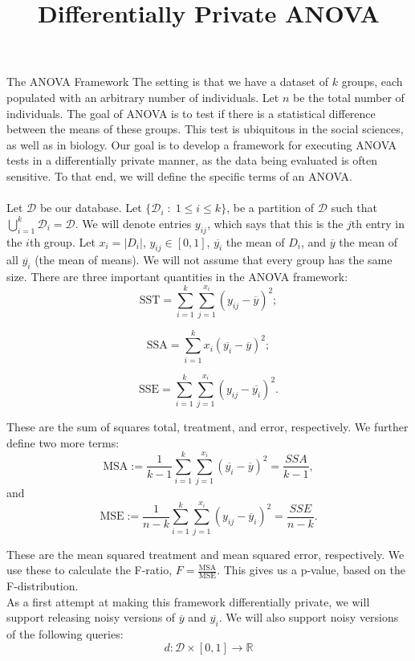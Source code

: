 \documentclass[11pt]{article}
\begin{document}
\title{Differentially Private ANOVA}

\maketitle


\begin{section}{The ANOVA Framework}
The setting is that we have a dataset of $k$ groups, each populated with 
an arbitrary number of individuals. Let $n$ be the total number of 
individuals.
The goal of ANOVA is to test if there 
is a statistical difference between the means of these groups. This test 
is ubiquitous in the social sciences, as well as in biology. Our goal is to 
develop a framework for executing ANOVA tests in a differentially 
private manner, as the data being evaluated is often sensitive. To that 
end, we will define the specific terms of an ANOVA.
\\
\\
Let $\mathcal{D}$ be our database. Let $\{\mathcal{D}_i\; : \; 1\leq i\leq 
k\}$, be a partition of $\mathcal{D}$ such that 
$\bigcup_{i=1}^k \mathcal{D}_i = \mathcal{D}$. We will denote entries 
$y_{ij}$, which says that this is the $j$th entry in the $i$th group. Let 
$x_i = |D_i|$, $y_{ij}\in [0,1]$, $\overline{y_i}$ the mean of $D_i$, and 
$\overline{y}$ the mean of all $\overline{y_i}$ (the mean of means). We will 
not assume that every group has the same size. There are three important 
quantities in the ANOVA framework:
\[
\text{SST} = \sum_{i=1}^k \sum_{j=1}^{x_i} (y_{ij} - \overline{y})^2;
\]

\[
\text{SSA} = \sum_{i=1}^{k} x_i(\overline{y_i} - \overline{y})^2;
\]

\[
\text{SSE} = \sum_{i=1}^k \sum_{j=1}^{x_i} (y_{ij} - \overline{y_i})^2.
\]

These are the sum of squares total, treatment, and error, respectively. 
We further define two more terms: 
\[
\text{MSA} := \frac{1}{k-1}\sum_{i=1}^{k} 
\sum_{j=1}^{x_i}(\overline{y_i} - \overline{y})^2 = \frac{SSA}{k-1},
\] 
and 
\[
\text{MSE} := \frac{1}{n-k} \sum_{i=1}^k \sum_{j=1}^{x_i} (y_{ij} - 
\overline{y}_i)^2 = \frac{SSE}{n-k}.
\]

These are the mean squared treatment and mean squared error, respectively. 
We use these to calculate the F-ratio, $F=\frac{\text{MSA}}{\text{MSE}}$. 
This gives us a p-value, based on the F-distribution.
\\
As a first attempt at making this framework differentially private, we will 
support releasing noisy versions of $\overline{y}$ and $\overline{y_i}$. We 
will also support noisy versions of the following queries:
\[
d:\mathcal{D}\times [0,1]\to\mathbb{R}
\]


\end{section}
\end{document}
